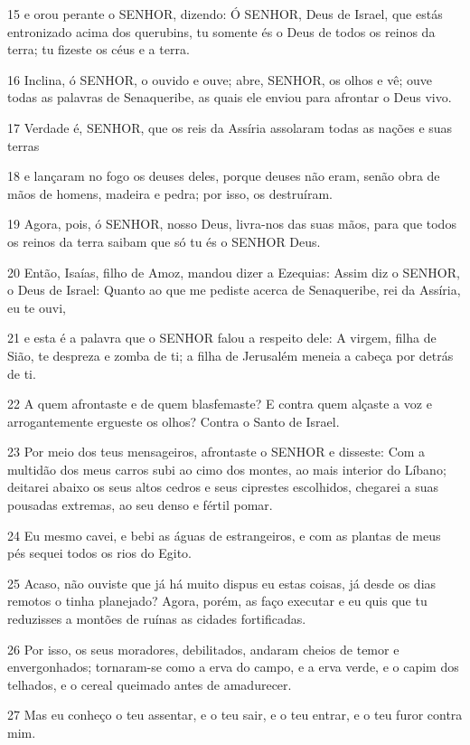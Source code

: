 \par 15 e orou perante o SENHOR, dizendo: Ó SENHOR, Deus de Israel, que estás entronizado acima dos querubins, tu somente és o Deus de todos os reinos da terra; tu fizeste os céus e a terra.
\par 16 Inclina, ó SENHOR, o ouvido e ouve; abre, SENHOR, os olhos e vê; ouve todas as palavras de Senaqueribe, as quais ele enviou para afrontar o Deus vivo.
\par 17 Verdade é, SENHOR, que os reis da Assíria assolaram todas as nações e suas terras
\par 18 e lançaram no fogo os deuses deles, porque deuses não eram, senão obra de mãos de homens, madeira e pedra; por isso, os destruíram.
\par 19 Agora, pois, ó SENHOR, nosso Deus, livra-nos das suas mãos, para que todos os reinos da terra saibam que só tu és o SENHOR Deus.
\par 20 Então, Isaías, filho de Amoz, mandou dizer a Ezequias: Assim diz o SENHOR, o Deus de Israel: Quanto ao que me pediste acerca de Senaqueribe, rei da Assíria, eu te ouvi,
\par 21 e esta é a palavra que o SENHOR falou a respeito dele: A virgem, filha de Sião, te despreza e zomba de ti; a filha de Jerusalém meneia a cabeça por detrás de ti.
\par 22 A quem afrontaste e de quem blasfemaste? E contra quem alçaste a voz e arrogantemente ergueste os olhos? Contra o Santo de Israel.
\par 23 Por meio dos teus mensageiros, afrontaste o SENHOR e disseste: Com a multidão dos meus carros subi ao cimo dos montes, ao mais interior do Líbano; deitarei abaixo os seus altos cedros e seus ciprestes escolhidos, chegarei a suas pousadas extremas, ao seu denso e fértil pomar.
\par 24 Eu mesmo cavei, e bebi as águas de estrangeiros, e com as plantas de meus pés sequei todos os rios do Egito.
\par 25 Acaso, não ouviste que já há muito dispus eu estas coisas, já desde os dias remotos o tinha planejado? Agora, porém, as faço executar e eu quis que tu reduzisses a montões de ruínas as cidades fortificadas.
\par 26 Por isso, os seus moradores, debilitados, andaram cheios de temor e envergonhados; tornaram-se como a erva do campo, e a erva verde, e o capim dos telhados, e o cereal queimado antes de amadurecer.
\par 27 Mas eu conheço o teu assentar, e o teu sair, e o teu entrar, e o teu furor contra mim.
